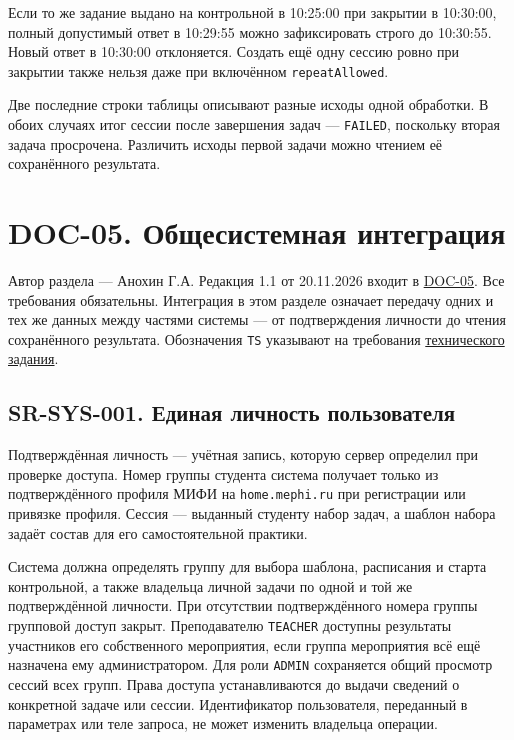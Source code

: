 \documentclass[12pt,a4paper]{article}
\begin{document}
Если то же задание выдано на контрольной в 10:25:00 при закрытии в 10:30:00, полный допустимый ответ в 10:29:55 можно зафиксировать строго до 10:30:55. Новый ответ в 10:30:00 отклоняется. Создать ещё одну сессию ровно при закрытии также нельзя даже при включённом \texttt{repeatAllowed}.

Две последние строки таблицы описывают разные исходы одной обработки. В обоих случаях итог сессии после завершения задач --- \texttt{FAILED}, поскольку вторая задача просрочена. Различить исходы первой задачи можно чтением её сохранённого результата.

\section{DOC-05. Общесистемная интеграция}\label{doc-05-ux43eux431ux449ux435ux441ux438ux441ux442ux435ux43cux43dux430ux44f-ux438ux43dux442ux435ux433ux440ux430ux446ux438ux44f}

\hypertarget{doc-05-общесистемная-интеграция}{}

Автор раздела --- Анохин Г.А. Редакция 1.1 от 20.11.2026 входит в {\hyperlink{doc-05-системные-требования}{DOC-05}}. Все требования обязательны. Интеграция в этом разделе означает передачу одних и тех же данных между частями системы --- от подтверждения личности до чтения сохранённого результата. Обозначения \texttt{TS} указывают на требования {\href{../02\_Техническое\_задание/DOC-02\_Техническое\_задание.pdf\#doc-02-техническое-задание}{технического задания}}.

\subsection{SR-SYS-001. Единая личность пользователя}\label{sr-sys-001-ux435ux434ux438ux43dux430ux44f-ux43bux438ux447ux43dux43eux441ux442ux44c-ux43fux43eux43bux44cux437ux43eux432ux430ux442ux435ux43bux44f}

\hypertarget{sr-sys-001-единая-личность-пользователя}{}

\hypertarget{sr-sys-001}{}

Подтверждённая личность --- учётная запись, которую сервер определил при проверке доступа. Номер группы студента система получает только из подтверждённого профиля МИФИ на \texttt{home.\allowbreak{}mephi.\allowbreak{}ru} при регистрации или привязке профиля. Сессия --- выданный студенту набор задач, а шаблон набора задаёт состав для его самостоятельной практики.

Система должна определять группу для выбора шаблона, расписания и старта контрольной, а также владельца личной задачи по одной и той же подтверждённой личности. При отсутствии подтверждённого номера группы групповой доступ закрыт. Преподавателю \texttt{TEACHER} доступны результаты участников его собственного мероприятия, если группа мероприятия всё ещё назначена ему администратором. Для роли \texttt{ADMIN} сохраняется общий просмотр сессий всех групп. Права доступа устанавливаются до выдачи сведений о конкретной задаче или сессии. Идентификатор пользователя, переданный в параметрах или теле запроса, не может изменить владельца операции.
\end{document}
